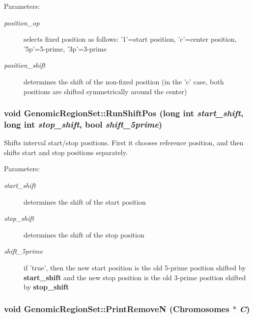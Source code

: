 \begin{Desc}
\item[Parameters:]
\begin{description}
\item[{\em position\_\-op}]selects fixed position as follows: '1'=start position, 'c'=center position, '5p'=5-prime, '3p'=3-prime \item[{\em position\_\-shift}]determines the shift of the non-fixed position (in the 'c' case, both positions are shifted symmetrically around the center) \end{description}
\end{Desc}
\hypertarget{classGenomicRegionSet_d4b42becffb21de5e89129476c79c851}{
\subsubsection[RunShiftPos]{\setlength{\rightskip}{0pt plus 5cm}void GenomicRegionSet::RunShiftPos (long int {\em start\_\-shift}, \/  long int {\em stop\_\-shift}, \/  bool {\em shift\_\-5prime})}}
\label{classGenomicRegionSet_d4b42becffb21de5e89129476c79c851}


Shifts interval start/stop positions. First it chooses reference position, and then shifts start and stop positions separately. 

\begin{Desc}
\item[Parameters:]
\begin{description}
\item[{\em start\_\-shift}]determines the shift of the start position \item[{\em stop\_\-shift}]determines the shift of the stop position \item[{\em shift\_\-5prime}]if 'true', then the new start position is the old 5-prime position shifted by {\bf start\_\-shift} and the new stop position is the old 3-prime position shifted by {\bf stop\_\-shift} \end{description}
\end{Desc}
\hypertarget{classGenomicRegionSet_6dc7150acdd7a0614f8a8497da687d0e}{
\subsubsection[PrintRemoveN]{\setlength{\rightskip}{0pt plus 5cm}void GenomicRegionSet::PrintRemoveN ({\bf Chromosomes} $\ast$ {\em C})}}
\label{classGenomicRegionSet_6dc7150acdd7a0614f8a8497da687d0e}


